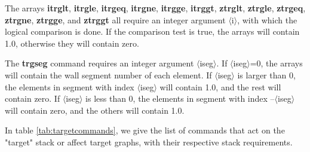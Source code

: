 \documentclass[a4paper,10pt]{report}
\begin{document}
The arrays {\bf itrglt}, {\bf itrgle}, {\bf itrgeq}, {\bf itrgne}, {\bf itrgge}, {\bf itrggt}, {\bf ztrglt}, {\bf ztrgle}, {\bf ztrgeq}, {\bf ztrgne}, {\bf ztrgge}, and {\bf ztrggt}
all require an integer argument $\langle$i$\rangle$,
with which the logical comparison is done. If the comparison test is true, the arrays
will contain 1.0, otherwise they will contain zero.

The {\bf trgseg} command requires an integer argument $\langle$iseg$\rangle$.
If $\langle$iseg$\rangle$=0, the arrays will contain the wall segment
number of each element. If $\langle$iseg$\rangle$ is larger than 0,
the elements in segment with index $\langle$iseg$\rangle$
will contain 1.0, and the rest will contain zero.
If $\langle$iseg$\rangle$ is less than 0,
the elements in segment with index --$\langle$iseg$\rangle$
will contain zero, and the others will contain 1.0.

In table \ref{tab:targetcommands}, we give the list of commands that
act on the "target" stack or affect target graphs, with their respective
stack requirements.
\end{document}
